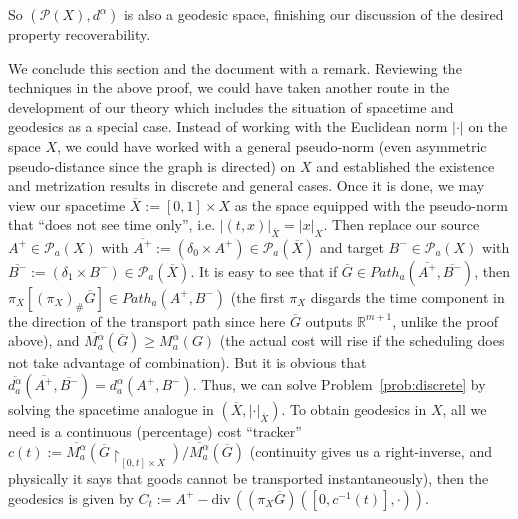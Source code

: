 \documentclass[fleqn]{article}
\theoremstyle{definition}
\theoremstyle{remark}
\renewcommand{\P}{\mathcal{P}} %
\begin{document}
So $(\P(X),d^\alpha)$ is also a geodesic space, finishing our discussion of the desired property recoverability.
\par
We conclude this section and the document with a remark. Reviewing the techniques in the above proof, we could have taken another route in the development of our theory which includes the situation of spacetime and geodesics as a special case. Instead of working with the Euclidean norm $|\cdot|$ on the space $X$, we could have worked with a general pseudo-norm (even asymmetric pseudo-distance since the graph is directed) on $X$ and established the existence and metrization results in discrete and general cases. Once it is done, we may view our spacetime $\overline{X}:= [0,1]\times X$ as the space equipped with the pseudo-norm that ``does not see time only'', i.e. $|(t,x)|_{\overline{X}} = |x|_X$. Then replace our source $A^+ \in\P_a(X)$ with $\overline{A^+}:=(\delta_0 \times A^+) \in\P_a(\overline{X})$ and target $B^- \in\P_a(X)$ with $\overline{B^-}:= (\delta_1 \times B^-) \in\P_a(\overline{X})$. It is easy to see that if $\overline{G}\in Path_a(\overline{A^+},\overline{B^-})$, then $\pi_X\left[(\pi_X)_\# \overline{G}\right] \in Path_a(A^+,B^-)$ (the first $\pi_X$ disgards the time component in the direction of the transport path since here $\overline{G}$ outputs $\mathbb{R}^{m+1}$, unlike the proof above), and $\overline{M_a^\alpha}(\overline{G}) \ge M_a^\alpha(G)$ (the actual cost will rise if the scheduling does not take advantage of combination). But it is obvious that $\overline{d_a^\alpha}(\overline{A^+},\overline{B^-}) = d_a^\alpha(A^+,B^-)$. Thus, we can solve Problem~\ref{prob:discrete} by solving the spacetime analogue in $\left( \overline{X},|\cdot|_{\overline{X}} \right)$. To obtain geodesics in $X$, all we need is a continuous (percentage) cost ``tracker'' $c(t):= \overline{M_a^\alpha} \left( \overline{G}\!\!\restriction_{[0,t] \times X} \right) / \overline{M_a^\alpha} \left( \overline{G} \right)$ (continuity gives us a right-inverse, and physically it says that goods cannot be transported instantaneously), then the geodesics is given by $C_t := A^+ - \mathrm{div}\,\left(  (\pi_X \overline{G})([0,c^{-1}(t)],\cdot) \right)$.



\end{document}

